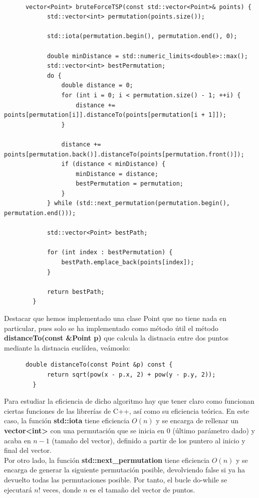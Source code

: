 \documentclass[11pt,openany]{book}
\begin{document}
\begin{lstlisting}

      vector<Point> bruteForceTSP(const std::vector<Point>& points) {
            std::vector<int> permutation(points.size());
      
            std::iota(permutation.begin(), permutation.end(), 0);
        
            double minDistance = std::numeric_limits<double>::max();
            std::vector<int> bestPermutation;
            do {
                double distance = 0;
                for (int i = 0; i < permutation.size() - 1; ++i) {
                    distance += points[permutation[i]].distanceTo(points[permutation[i + 1]]);
                }
        
                distance += points[permutation.back()].distanceTo(points[permutation.front()]);
                if (distance < minDistance) {
                    minDistance = distance;
                    bestPermutation = permutation;
                }
            } while (std::next_permutation(permutation.begin(), permutation.end()));
        
            std::vector<Point> bestPath;
        
            for (int index : bestPermutation) {
                bestPath.emplace_back(points[index]);
            }
        
            return bestPath;
        }
\end{lstlisting}
Destacar que hemos implementado una clase Point que no tiene nada en particular, pues solo se ha implementado
como método útil el método \textbf{distanceTo(const \&Point p)} que calcula la distnacia entre dos puntos
mediante la distnacia euclídea, veámoslo:
\begin{lstlisting}
      double distanceTo(const Point &p) const {
            return sqrt(pow(x - p.x, 2) + pow(y - p.y, 2));
        }
\end{lstlisting}
Para estudiar la eficiencia de dicho algoritmo hay que tener claro como funcionan ciertas funciones de las librerías de C++, así como
su eficiencia teórica. En este caso, la función \textbf{std::iota} tiene eficiencia $O(n)$ y se encarga de rellenar un \textbf{vector<int>}
con una permutación que se inicia en $0$ (último parámetro dado) y acaba en $n-1$ (tamaño del vector), definido a partir de los puntero al inicio
y final del vector. \\
Por otro lado, la función \textbf{std::next\_permutation} tiene eficiencia $O(n)$ y se encarga de generar la siguiente permutación posible, devolviendo
 false si ya ha devuelto todas las permutaciones posible. Por tanto, el bucle do-while se ejecutará $n!$ veces, donde $n$ es el tamaño del vector de puntos. \\ \\
\end{document}
